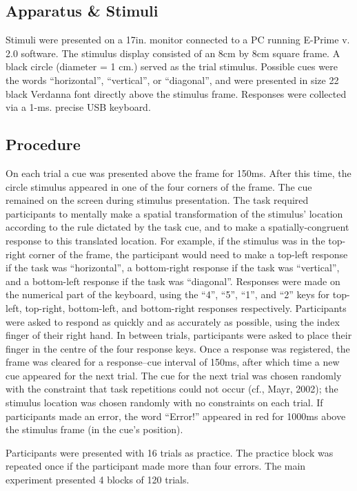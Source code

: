 \documentclass[a4paper, man, natbib]{apa6}
\begin{document}
\subsection{Apparatus \& Stimuli}
Stimuli were presented on a 17in. monitor connected to a PC running E-Prime v. 2.0 software. The stimulus display consisted of an 8cm by 8cm square frame. A black circle (diameter = 1 cm.) served as the trial stimulus. Possible cues were the words ``horizontal'', ``vertical'', or ``diagonal'', and were presented in size 22 black Verdanna font directly above the stimulus frame. Responses were collected via a 1-ms. precise USB keyboard.

\subsection{Procedure}
On each trial a cue was presented above the frame for 150ms. After this time, the circle stimulus appeared in one of the four corners of the frame. The cue remained on the screen during stimulus presentation. The task required participants to mentally make a spatial transformation of the stimulus' location according to the rule dictated by the task cue, and to make a spatially-congruent response to this translated location. For example, if the stimulus was in the top-right corner of the frame, the participant would need to make a top-left response if the task was ``horizontal'', a bottom-right response if the task was ``vertical'', and a bottom-left response if the task was ``diagonal''. Responses were made on the numerical part of the keyboard, using the ``4'', ``5'', ``1'', and ``2'' keys for top-left, top-right, bottom-left, and bottom-right responses respectively. Participants were asked to respond as quickly and as accurately as possible, using the index finger of their right hand. In between trials, participants were asked to place their finger in the centre of the four response keys. Once a response was registered, the frame was cleared for a response--cue interval of 150ms, after which time a new cue appeared for the next trial. The cue for the next trial was chosen randomly with the constraint that task repetitions could not occur (cf., Mayr, 2002); the stimulus location was chosen randomly with no constraints on each trial. If participants made an error, the word ``Error!'' appeared in red for 1000ms above the stimulus frame (in the cue's position).

Participants were presented with 16 trials as practice. The practice block was repeated once if the participant made more than four errors. The main experiment presented 4 blocks of 120 trials. 
\end{document}
